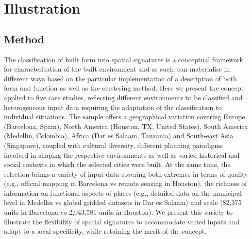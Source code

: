 \section{Illustration}
\label{sec:app}



\subsection{Method}

The classification of built form into spatial signatures is a conceptual
framework for characterisation of the built environment and as such, can
materialise in different ways based on the particular implementation of a
description of both form and function as well as the clustering method.
Here we present the concept applied to five case studies, reflecting different
environments to be classified and heterogeneous input data requiring the
adaptation of the classification to individual situations.
The sample offers a geographical variation covering Europe (Barcelona, Spain),
North America (Houston, TX, United States), South America (Medellin, Colombia),
Africa (Dar es Salaam, Tanzania) and South-east Asia (Singapore),
coupled with cultural diversity, different planning paradigms involved in
shaping the respective environments as well as varied historical and social
contexts in which the selected cities were built.
At the same time, the selection brings a variety of input data covering both
extremes in terms of quality (e.g., official mapping in Barcelona vs remote
sensing in Houston), the richness of information on functional aspects of places
(e.g., detailed data on the municipal level in Medellin vs global gridded
datasets in Dar es Salaam) and scale (82,375 units in Barcelona vs 2,043,581 units in
Houston).
We present this variety to illustrate the flexibility of spatial signatures to
accommodate varied inputs and adapt to a local specificity, while retaining the
merit of the concept.

